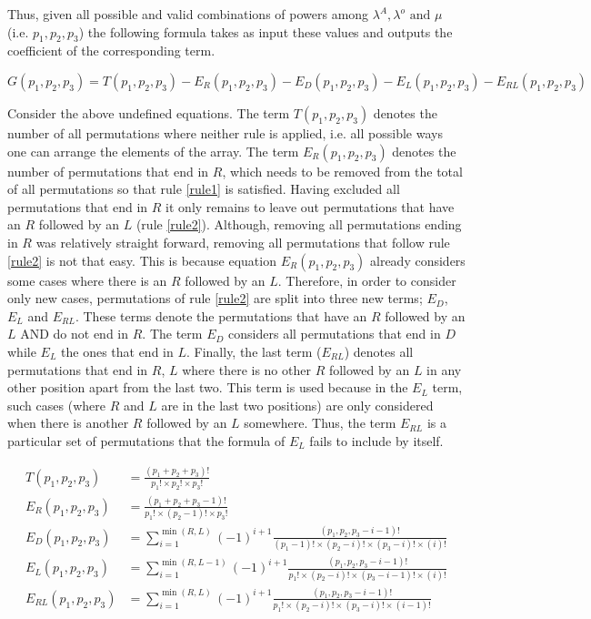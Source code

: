 Thus, given all possible and valid combinations of powers among \(\lambda^A, \lambda^o \text{ and } \mu\) (i.e. \(p_1,p_2,p_3\)) the following formula takes as input these values and outputs the coefficient of the corresponding term.

\begin{equation} \label{eq:permutation formula}
    G(p_1, p_2, p_3) = T(p_1, p_2, p_3) - E_R(p_1, p_2, p_3) - E_D(p_1, p_2, p_3) - E_L(p_1, p_2, p_3) - E_{RL}(p_1, p_2, p_3)
\end{equation}

Consider the above undefined equations. 
The term \(T(p_1,p_2,p_3)\) denotes the number of all permutations where neither rule is applied, i.e. all possible ways one can arrange the elements of the array.
The term \(E_R(p_1,p_2,p_3)\) denotes the number of permutations that end in \(R\), which needs to be removed from the total of all permutations so that rule \ref{rule1} is satisfied.
Having excluded all permutations that end in \(R\) it only remains to leave out permutations that have an \(R\) followed by an \(L\) (rule \ref{rule2}).
Although, removing all permutations ending in \(R\) was relatively straight forward, removing all permutations that follow rule \ref{rule2} is not that easy.
This is because equation \(E_R(p_1,p_2,p_3)\) already considers some cases where there is an \(R\) followed by an \(L\).
Therefore, in order to consider only new cases, permutations of rule \ref{rule2} are split into three new terms; \(E_D\), \(E_L\) and \(E_{RL}\).
These terms denote the permutations that have an \(R\) followed by an \(L\) AND do not end in \(R\).
The term \(E_D\) considers all permutations that end in \(D\) while \(E_L\) the ones that end in \(L\).
Finally, the last term (\(E_{RL}\)) denotes all permutations that end in \(R\), \(L\) where there is no other \(R\) followed by an \(L\) in any other position apart from the last two. 
This term is used because in the \(E_L\) term, such cases (where \(R\) and \(L\) are in the last two positions) are only considered when there is another \(R\) followed by an \(L\) somewhere.
Thus, the term \(E_{RL}\) is a particular set of permutations that the formula of \(E_L\) fails to include by itself.

\begin{align}
    T(p_1, p_2, p_3) &= \frac{(p_1 + p_2 + p_3)!}{p_1! \times p_2! \times p_3!} \\
    E_R(p_1, p_2, p_3) &= \frac{(p_1 + p_2 + p_3 - 1)!}{p_1! \times (p_2-1)! \times p_3!} \\
    E_D(p_1, p_2, p_3) &= \sum_{i=1}^{\min(R,L)} (-1)^{i+1} \frac{(p_1, p_2, p_3 - i - 1)!}{(p_1 - 1)! \times (p_2 - i)! \times (p_3 - i)! \times (i)!} \\
    E_L(p_1, p_2, p_3) &= \sum_{i=1}^{\min(R,L-1)} (-1)^{i+1} \frac{(p_1, p_2, p_3 - i - 1)!}{p_1! \times (p_2 - i)! \times (p_3 - i - 1)! \times (i)!} \\
    E_{RL}(p_1, p_2, p_3) &= \sum_{i=1}^{\min(R,L)} (-1)^{i+1} \frac{(p_1, p_2, p_3 - i - 1)!}{p_1! \times (p_2 - i)! \times (p_3 - i)! \times (i - 1)!} 
\end{align}



